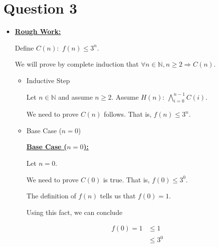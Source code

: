 \documentclass[12pt]{article}
\begin{document}
\section*{Question 3}
\begin{itemize}
    \item

    \begin{mdframed}
        \underline{\textbf{Rough Work:}}

        \bigskip

        Define $C(n):$ $f(n) \leq 3^n$.

        \bigskip

        We will prove by complete induction that $\forall n \in \mathbb{N}, n \geq 2 \Rightarrow C(n)$.

        \bigskip

        \begin{itemize}
            \item Inductive Step

            \begin{mdframed}
            Let $n \in \mathbb{N}$ and assume $n \geq 2$. Assume $H(n):\:\bigwedge\limits_{i=0}^{n-1} C(i)$.

            \bigskip

            We need to prove $C(n)$ follows. That is, $f(n) \leq 3^n$.
            \end{mdframed}

            \item Base Case ($n = 0$)

            \begin{mdframed}
            \underline{\textbf{Base Case ($n = 0$):}}

            \bigskip

            Let $n = 0$.

            \bigskip

            We need to prove $C(0)$ is true. That is, $f(0) \leq 3^0$.

            \bigskip

            The definition of $f(n)$ tells us that $f(0) = 1$.

            \bigskip

            Using this fact, we can conclude

            \begin{align}
                f(0) = 1 &\leq 1\\
                &\leq 3^0
            \end{align}
            \end{mdframed}


\end{itemize}
\end{mdframed}
\end{itemize}
\end{document}
